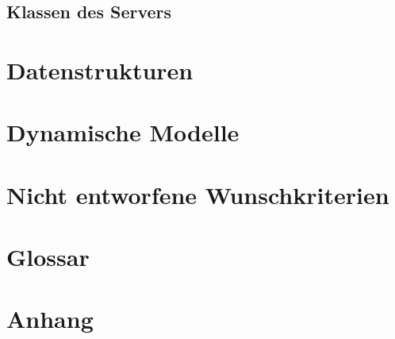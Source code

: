 \documentclass[a4paper]{scrreprt}
\begin{document}
\section{Klassen des Servers}
 



\chapter{Datenstrukturen}

\chapter{Dynamische Modelle}

\chapter{Nicht entworfene Wunschkriterien}

\chapter{Glossar}

\chapter{Anhang}
\end{document}
